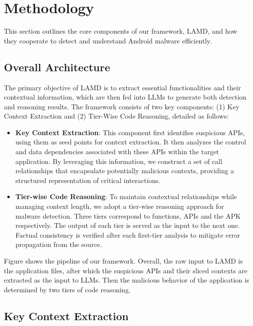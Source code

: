 \section{Methodology}
This section outlines the core components of our framework, LAMD, and how they cooperate to detect and understand Android malware efficiently.

\subsection{Overall Architecture}
The primary objective of LAMD is to extract essential functionalities and their contextual information, which are then fed into LLMs to generate both detection and reasoning results. The framework consists of two key components: (1) Key Context Extraction and (2) Tier-Wise Code Reasoning, detailed as follows:
\begin{itemize}
    \item \textbf{Key Context Extraction}: This component first identifies suspicious APIs, using them as seed points for context extraction. It then analyzes the control and data dependencies associated with these APIs within the target application. By leveraging this information, we construct a set of call relationships that encapsulate potentially malicious contexts, providing a structured representation of critical interactions.
    \item \textbf{Tier-wise Code Reasoning}: To maintain contextual relationships while managing context length, we adopt a tier-wise reasoning approach for malware detection. Three tiers correspond to functions, APIs and the APK respectively. The output of each tier is served as the input to the next one. Factual consistency is verified after each first-tier analysis to mitigate error propagation from the source.
\end{itemize}
Figure shows the pipeline of our framework. Overall, the raw input to LAMD is the application files, after which the suspicious APIs and their sliced contexts are extracted as the input to LLMs. Then the malicious behavior of the application is determined by two tiers of code reasoning.

\subsection{Key Context Extraction}
